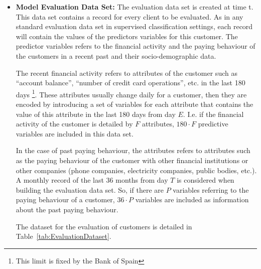\begin{itemize}
\item \textbf{Model Evaluation Data Set:} The evaluation data set is created at time t. This data set contains a record for every client to be evaluated. As in any standard evaluation data set in supervised classification settings, each record will contain the values of the predictors variables for this customer. The predictor variables refers to the financial activity and the paying behaviour of the customers in a recent past and their socio-demographic data. 

The recent financial activity refers to attributes of the customer such as ``account balance'', ``number of credit card operations'', etc. in the last 180 days \footnote{This limit is fixed by the Bank of Spain}. These attributes usually change daily for a customer, then they are encoded by introducing a set of variables for each attribute that contains the value of this attribute in the last 180 days from day $E$. I.e. if the financial activity of the customer is detailed by $F$ attributes,   $180\cdot F$ predictive variables are included in this data set.

In the case of past paying behaviour, the attributes refers to attributes such as the paying behaviour of the customer with other financial institutions or other companies (phone companies, electricity companies, public bodies, etc.). A monthly record of the last 36 months from day $T$ is considered when building the evaluation data set. So, if there are $P$ variables referring to the paying behaviour of a customer, $36\cdot P$ variables are included as information about the past paying behaviour. 

The dataset for the evaluation of customers is detailed in Table~\ref{tab:EvaluationDataset}.

\newcommand{\X}{\mathbf{X}}
\newcommand{\Y}{\mathbf{Y}}
\newcommand{\Z}{\mathbf{Z}}


\end{itemize}
